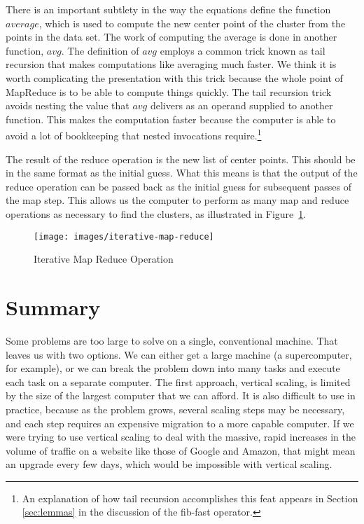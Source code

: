 There is an important subtlety in the way the equations define
the function $average$, which is used to compute the new center point of the cluster
from the points in the data set.
The work of computing the average is done in another function, $avg$.
The definition of $avg$ employs a common trick known as tail recursion
that makes computations like averaging much faster.
We think it is worth complicating the presentation 
with this trick because the whole point
of MapReduce is to be able to compute things quickly.
The tail recursion trick avoids nesting the value that $avg$ delivers
as an operand supplied to another function.
This makes the computation
faster because the computer is able to avoid a lot of bookkeeping that nested
invocations require.\footnote{An 
explanation of how tail recursion accomplishes this feat appears
in Section \ref{sec:lemmas} in the discussion of the fib-fast operator.}


The result of the reduce operation is the new list of center points.  
This should be in the same format as the initial guess.  
What this means is that the output of the
reduce operation can be passed back as 
the initial guess for subsequent passes of the map step.  
This allows us the computer to perform as many map and reduce operations as necessary
to find the clusters, as illustrated in Figure~\ref{iterative-map-reduce}.

\begin{figure}
    \begin{center}
        \texttt{[image: images/iterative-map-reduce]}
    \end{center}
    \caption{Iterative Map Reduce Operation}
    \label{iterative-map-reduce}
\end{figure}

\section{Summary}

Some problems are too large to solve on a single, conventional machine.  That leaves us
with two options.  We can either get a large machine (a supercomputer, for example), 
or we can break the problem down into many tasks and execute each task on a separate computer.
The first approach, vertical scaling, is limited by the size of the largest computer that
we can afford.  It is also difficult to use in practice, because as the problem grows,
several scaling steps may be
necessary, and each step requires an expensive migration to a more capable computer.
If we were trying to use vertical scaling to deal with the massive, rapid increases
in the volume of traffic on a website like those of Google and Amazon,
that might mean an upgrade every few days, which would be impossible with
vertical scaling.

